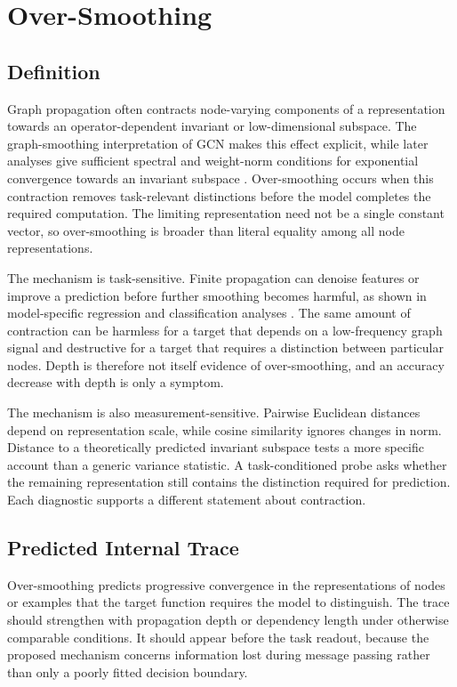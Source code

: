 \section{Over-Smoothing}

\subsection{Definition}

Graph propagation often contracts node-varying components of a representation towards an operator-dependent invariant or low-dimensional subspace.
The graph-smoothing interpretation of GCN makes this effect explicit, while later analyses give sufficient spectral and weight-norm conditions for exponential convergence towards an invariant subspace \cite{li2018deeper,oono2020exponentially}.
Over-smoothing occurs when this contraction removes task-relevant distinctions before the model completes the required computation.
The limiting representation need not be a single constant vector, so over-smoothing is broader than literal equality among all node representations.

The mechanism is task-sensitive.
Finite propagation can denoise features or improve a prediction before further smoothing becomes harmful, as shown in model-specific regression and classification analyses \cite{keriven2022not}.
The same amount of contraction can be harmless for a target that depends on a low-frequency graph signal and destructive for a target that requires a distinction between particular nodes.
Depth is therefore not itself evidence of over-smoothing, and an accuracy decrease with depth is only a symptom.

The mechanism is also measurement-sensitive.
Pairwise Euclidean distances depend on representation scale, while cosine similarity ignores changes in norm.
Distance to a theoretically predicted invariant subspace tests a more specific account than a generic variance statistic.
A task-conditioned probe asks whether the remaining representation still contains the distinction required for prediction.
Each diagnostic supports a different statement about contraction.

\subsection{Predicted Internal Trace}

Over-smoothing predicts progressive convergence in the representations of nodes or examples that the target function requires the model to distinguish.
The trace should strengthen with propagation depth or dependency length under otherwise comparable conditions.
It should appear before the task readout, because the proposed mechanism concerns information lost during message passing rather than only a poorly fitted decision boundary.

